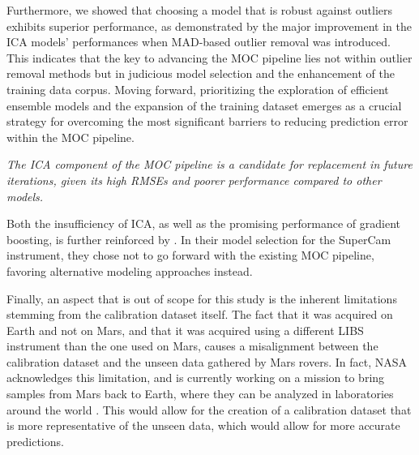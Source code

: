 Furthermore, we showed that choosing a model that is robust against outliers exhibits superior performance, as demonstrated by the major improvement in the ICA models' performances when MAD-based outlier removal was introduced.
This indicates that the key to advancing the MOC pipeline lies not within outlier removal methods but in judicious model selection and the enhancement of the training data corpus.
Moving forward, prioritizing the exploration of efficient ensemble models and the expansion of the training dataset emerges as a crucial strategy for overcoming the most significant barriers to reducing prediction error within the MOC pipeline.

\vspace{2mm}\noindent\textit{The ICA component of the MOC pipeline is a candidate for replacement in future iterations, given its high RMSEs and poorer performance compared to other models.}

\noindent
Both the insufficiency of ICA, as well as the promising performance of gradient boosting, is further reinforced by \citet{andersonPostlandingMajorElement2022}. In their model selection for the SuperCam instrument, they chose not to go forward with the existing MOC pipeline, favoring alternative modeling approaches instead.

\vspace{2mm}\noindent
Finally, an aspect that is out of scope for this study is the inherent limitations stemming from the calibration dataset itself.
The fact that it was acquired on Earth and not on Mars, and that it was acquired using a different LIBS instrument than the one used on Mars, causes a misalignment between the calibration dataset and the unseen data gathered by Mars rovers.
In fact, NASA acknowledges this limitation, and is currently working on a mission to bring samples from Mars back to Earth, where they can be analyzed in laboratories around the world \cite{mars-sample-return}.
This would allow for the creation of a calibration dataset that is more representative of the unseen data, which would allow for more accurate predictions.